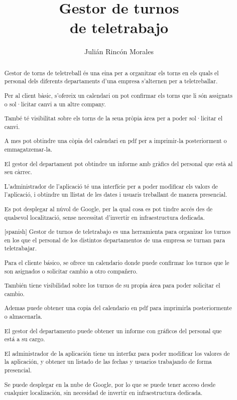 \documentclass[11pt,spanish,listoffigures,listoftables]{tfgetsinf}
\title{Gestor de turnos  \\
         de teletrabajo}
\author{Julián Rincón Morales}
\begin{document}

\begin{abstract}
Gestor de torns de teletreball és una eina per a organitzar els torns en els quals el personal dels diferents departaments d'una empresa s'alternen per a teletreballar.

Per al client bàsic, s'ofereix un calendari on pot confirmar els torns que li són assignats o sol·licitar canvi a un altre company.

També té visibilitat sobre els torns de la seua pròpia àrea per a poder sol·licitar el canvi.

A mes pot obtindre una còpia del calendari en pdf per a imprimir-la posteriorment o emmagatzemar-la.

El gestor del departament pot obtindre un informe amb gràfics del personal que està al seu càrrec.

L'administrador de l'aplicació té una interfície per a poder modificar els valors de l'aplicació, i obtindre un llistat de les dates i usuaris treballant de manera presencial.

Es pot desplegar al núvol de Google, per la qual cosa es pot tindre accés des de qualsevol localització, sense necessitat d'invertir en infraestructura dedicada.

\end{abstract}

\begin{abstract}[spanish]
Gestor de turnos de teletrabajo es una herramienta para organizar los turnos en los que el personal de los distintos departamentos de una empresa se turnan para teletrabajar.

Para el cliente básico, se ofrece un calendario donde puede confirmar los turnos que le son asignados o solicitar cambio a otro compañero.

También tiene visibilidad sobre los turnos de su propia área para poder solicitar el cambio.

Ademas puede obtener una copia del calendario en pdf para imprimirla posteriormente o almacenarla.

El gestor del departamento puede obtener un informe con gráficos del personal que está a su cargo.

El administrador de la aplicación tiene un interfaz para poder modificar los valores de la aplicación, y obtener un listado de las fechas y usuarios trabajando de forma presencial.

Se puede desplegar en la nube de Google, por lo que se puede tener acceso desde cualquier localización, sin necesidad de invertir en infraestructura dedicada.


\end{abstract}
\end{document}
